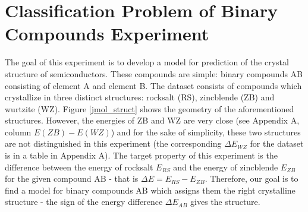 \documentclass[11pt,oneside,czech,american]{book} %
\theoremstyle{plain}
\theoremstyle{definition}
\begin{document}

\chapter{Classification Problem of Binary Compounds Experiment}
The goal of this experiment is to develop a model for prediction of the crystal structure of semiconductors. These compounds are simple: binary compounds AB consisting of element A and element B. The dataset consists of compounds which crystallize in three distinct structures: rocksalt (RS), zincblende (ZB) and wurtzite (WZ). Figure \ref{jmol_struct} shows the geometry of the aforementioned structures. However, the energies of ZB and WZ are very close (see Appendix A, column $E(ZB) - E(WZ)$) and for the sake of simplicity, these two structures are not distinguished in this experiment (the corresponding $\Delta E_{WZ}$ for the dataset is in a table in Appendix A). The target property of this experiment is the difference between the energy of rocksalt $E_{RS}$ and the energy of zincblende $E_{ZB}$ for the given compound AB - that is $\Delta E = E_{RS} - E_{ZB}$. Therefore, our goal is to find a model for binary compounds AB which assigns them the right crystalline structure - the sign of the energy difference $\Delta E_{AB}$ gives the structure.
\end{document}
